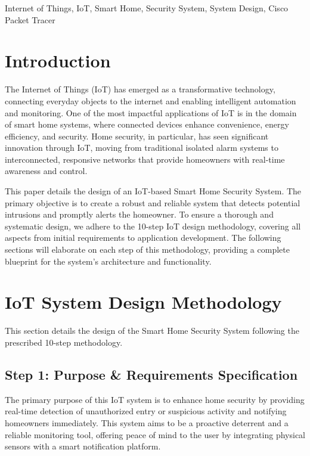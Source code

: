 \documentclass[conference]{IEEEtran}
\begin{document}
\begin{IEEEkeywords}
Internet of Things, IoT, Smart Home, Security System, System Design, Cisco Packet Tracer
\end{IEEEkeywords}



\section{Introduction}

The Internet of Things (IoT) has emerged as a transformative technology, connecting everyday objects to the internet and enabling intelligent automation and monitoring. One of the most impactful applications of IoT is in the domain of smart home systems, where connected devices enhance convenience, energy efficiency, and security. Home security, in particular, has seen significant innovation through IoT, moving from traditional isolated alarm systems to interconnected, responsive networks that provide homeowners with real-time awareness and control.

This paper details the design of an IoT-based Smart Home Security System. The primary objective is to create a robust and reliable system that detects potential intrusions and promptly alerts the homeowner. To ensure a thorough and systematic design, we adhere to the 10-step IoT design methodology, covering all aspects from initial requirements to application development. The following sections will elaborate on each step of this methodology, providing a complete blueprint for the system's architecture and functionality.


\section{IoT System Design Methodology}
This section details the design of the Smart Home Security System following the prescribed 10-step methodology.

\subsection{Step 1: Purpose \& Requirements Specification}
The primary purpose of this IoT system is to enhance home security by providing real-time detection of unauthorized entry or suspicious activity and notifying homeowners immediately. This system aims to be a proactive deterrent and a reliable monitoring tool, offering peace of mind to the user by integrating physical sensors with a smart notification platform.
\end{document}

